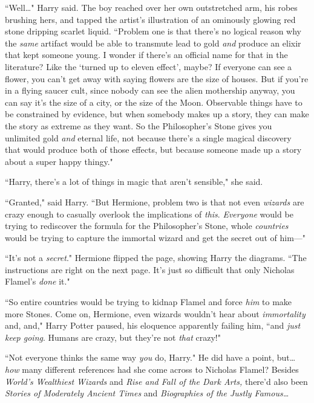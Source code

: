 ``Well{\ldots}" Harry said. The boy reached over her own outstretched arm, his robes brushing hers, and tapped the artist's illustration of an ominously glowing red stone dripping scarlet liquid. ``Problem one is that there's no logical reason why the \emph{same} artifact would be able to transmute lead to gold \emph{and} produce an elixir that kept someone young. I wonder if there's an official name for that in the literature? Like the `turned up to eleven effect', maybe? If everyone can see a flower, you can't get away with saying flowers are the size of houses. But if you're in a flying saucer cult, since nobody can see the alien mothership anyway, you can say it's the size of a city, or the size of the Moon. Observable things have to be constrained by evidence, but when somebody makes up a story, they can make the story as extreme as they want. So the Philosopher's Stone gives you unlimited gold \emph{and} eternal life, not because there's a single magical discovery that would produce both of those effects, but because someone made up a story about a super happy thingy."

``Harry, there's a lot of things in magic that aren't sensible," she said.

``Granted," said Harry. ``But Hermione, problem two is that not even \emph{wizards} are crazy enough to casually overlook the implications of \emph{this}. \emph{Everyone} would be trying to rediscover the formula for the Philosopher's Stone, whole \emph{countries} would be trying to capture the immortal wizard and get the secret out of him—"

``It's not a \emph{secret}." Hermione flipped the page, showing Harry the diagrams. ``The instructions are right on the next page. It's just so difficult that only Nicholas Flamel's \emph{done} it."

``So entire countries would be trying to kidnap Flamel and force \emph{him} to make more Stones. Come on, Hermione, even wizards wouldn't hear about \emph{immortality} and, and," Harry Potter paused, his eloquence apparently failing him, ``and \emph{just keep going}. Humans are crazy, but they're not \emph{that} crazy!"

``Not everyone thinks the same way \emph{you} do, Harry." He did have a point, but{\ldots} \emph{how} many different references had she come across to Nicholas Flamel? Besides \emph{World's Wealthiest Wizards} and \emph{Rise and Fall of the Dark Arts,} there'd also been \emph{Stories of Moderately Ancient Times} and \emph{Biographies of the Justly Famous{\ldots}}

